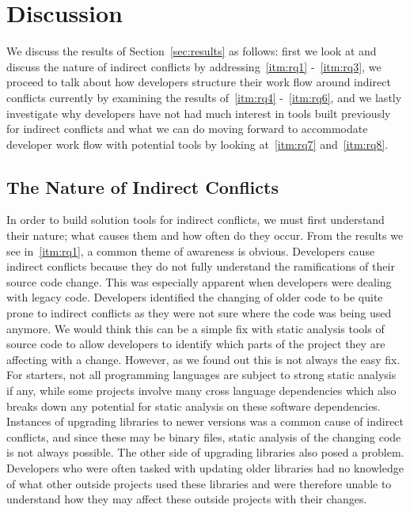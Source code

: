 \documentclass[conference]{IEEEtran}
\begin{document}
\section{Discussion}
\label{sec:disc}

We discuss the results of Section~\ref{sec:results} as follows: first we look at and discuss the nature of indirect conflicts by addressing~\ref{itm:rq1} 
-~\ref{itm:rq3}, we proceed to talk about how developers structure their work flow around indirect conflicts currently by
examining the results of~\ref{itm:rq4} -~\ref{itm:rq6}, and we lastly investigate why developers have not had much interest in tools built previously
for indirect conflicts and what we can do moving forward to accommodate developer work flow with potential tools by looking at~\ref{itm:rq7} 
and~\ref{itm:rq8}.

\subsection{The Nature of Indirect Conflicts}

In order to build solution tools for indirect conflicts, we must first understand their nature; what causes them and how often do they 
occur. From the results we see in~\ref{itm:rq1}, a common theme of awareness is obvious. Developers cause indirect conflicts because they do not
fully understand the ramifications of their source code change. This was especially apparent when developers were dealing with legacy code.
Developers identified the changing of older code to be quite prone to indirect conflicts as they were not sure where the code was being used
anymore. We would think this can be a simple fix with static analysis tools of source
code to allow developers to identify which parts of the project they are affecting with a change. However, as we found out this is not always
the easy fix. For starters, not all programming languages are subject to strong static analysis if any, while some projects involve many
cross language dependencies which also breaks down any potential for static analysis on these software dependencies. 
Instances of upgrading libraries to newer versions was a common cause of indirect conflicts, and since these may be binary files,
static analysis of the changing code is not always possible. The other side of upgrading libraries also posed a problem. Developers who were often
tasked with updating older libraries had no knowledge of what other outside projects used these libraries and were therefore unable to understand
how they may affect these outside projects with their changes.
\end{document}
